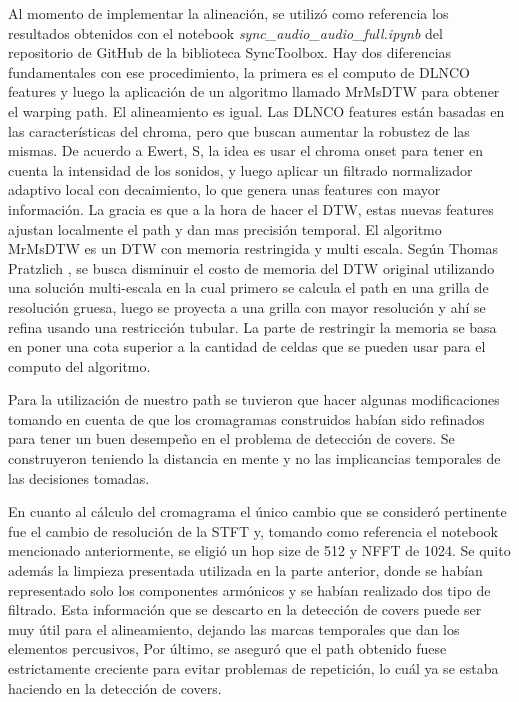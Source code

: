 \documentclass{article}
\begin{document}
Al momento de implementar la alineación, se utilizó como referencia los resultados obtenidos con el notebook \textit{sync\_audio\_audio\_full.ipynb} del repositorio de GitHub \cite{GitHub} de la biblioteca SyncToolbox. Hay dos diferencias fundamentales con ese procedimiento, la primera es el computo de DLNCO features y luego la aplicación de un algoritmo llamado MrMsDTW para obtener el warping path. El alineamiento es igual. Las DLNCO features están basadas en las características del chroma, pero que buscan aumentar la robustez de las mismas. De acuerdo a Ewert, S\cite{DLNCO}, la idea es usar el chroma onset para tener en cuenta la intensidad de los sonidos, y luego aplicar un filtrado normalizador adaptivo local con decaimiento, lo que genera unas features con mayor información. La gracia es que a la hora de hacer el DTW, estas nuevas features ajustan localmente el path y dan mas precisión temporal. 
El algoritmo MrMsDTW es un DTW con memoria restringida y multi escala. Según Thomas Pratzlich \cite{MrMs}, se busca disminuir el costo de memoria del DTW original utilizando una solución multi-escala en la cual primero se calcula el path en una grilla de resolución gruesa, luego se proyecta a una grilla con mayor resolución y ahí se refina usando  una restricción tubular. La parte de restringir la memoria se basa en poner una cota superior a la cantidad de celdas que se pueden usar para el computo del algoritmo. 

Para la utilización de nuestro path se tuvieron que hacer algunas modificaciones tomando en cuenta de que los cromagramas construidos habían sido refinados para tener un buen desempeño en el problema de detección de covers. Se construyeron teniendo la distancia en mente y no las implicancias temporales de las decisiones tomadas. 

En cuanto al cálculo del cromagrama el único cambio que se consideró pertinente fue el cambio de resolución de la STFT y, tomando como referencia el notebook mencionado anteriormente, se eligió un hop size de 512 y NFFT de 1024. Se quito además la limpieza presentada utilizada en la parte anterior, donde se habían representado solo los componentes armónicos y se habían realizado dos tipo de filtrado. Esta información que se descarto en la detección de covers puede ser muy útil para el alineamiento, dejando las marcas temporales que dan los elementos percusivos, Por último, se aseguró que el path obtenido fuese estrictamente creciente para evitar problemas de repetición, lo cuál ya se estaba haciendo en la detección de covers. 
\end{document}
